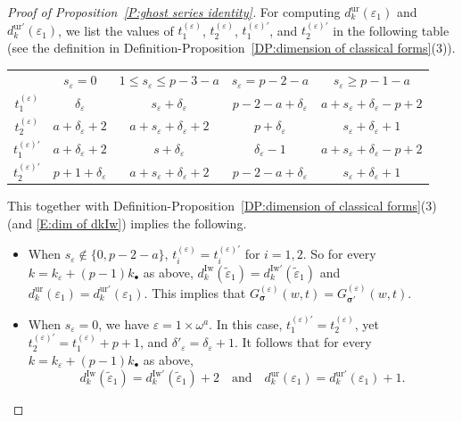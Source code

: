 \documentclass[12pt]{amsart}
\theoremstyle{definition}
\numberwithin{equation}{subsection}
\newcommand{\bbsigma}{\boldsymbol{\sigma}}
\newcommand{\Iw}{\mathrm{Iw}}
\newcommand{\ur}{\mathrm{ur}}
\begin{document}
\begin{proof}[Proof of Proposition~\ref{P:ghost series identity}]
For computing $d_k^\ur(\varepsilon_1)$ and $d_k^{\ur\prime}(\varepsilon_1)$, we list the values of $t_1^{(\varepsilon)}$, $t_2^{(\varepsilon)}$, $t_1^{(\varepsilon)\prime}$, and $t_2^{(\varepsilon)\prime}$ in the following table (see the definition in Definition-Proposition~\ref{DP:dimension of classical forms}(3)).
\begin{center}
\begin{tabular}{|c|c|c|c|c|}
\hline &$s_\varepsilon = 0$  & $1\leq s_\varepsilon \leq p-3-a$ & $s_\varepsilon = p-2-a$ & $s_\varepsilon \geq p-1-a$
\\
\hhline{|=|=|=|=|=|}
$t_1^{(\varepsilon)}$ & $\delta_\varepsilon$ & $s_\varepsilon+\delta_\varepsilon$ & $p-2-a+\delta_\varepsilon$ & $a+s_\varepsilon + \delta_\varepsilon-p+2$
\\
\hline
$t_2^{(\varepsilon)}$ & $a+\delta_\varepsilon + 2$ & $a+s_\varepsilon + \delta_\varepsilon+2$ & $p+\delta_\varepsilon$ & $s_\varepsilon + \delta_\varepsilon+1$
\\
\hline
$t_1^{(\varepsilon)'}$ & $a+\delta_\varepsilon + 2$ & $s+\delta_\varepsilon$ & $\delta_\varepsilon -1$ & $a+s_\varepsilon + \delta_\varepsilon-p+2$
\\
\hline
$t_2^{(\varepsilon)'}$ & $p+1+\delta_\varepsilon$ & $a+s_\varepsilon+\delta_\varepsilon + 2$ & $p-2-a+\delta_\varepsilon$ & $s_\varepsilon + \delta_\varepsilon+1$
\\
\hline
\end{tabular}
\end{center}
This together with Definition-Proposition~\ref{DP:dimension of classical forms}(3) (and \eqref{E:dim of dkIw}) implies the following.
\begin{itemize}
\item When $s_\varepsilon \not\in\{0, p-2-a\}$, $t_i^{(\varepsilon)} = t_i^{(\varepsilon)\prime}$ for $i=1,2$. So for every $k = k_\varepsilon+(p-1)k_\bullet$ as above, $d_k^\Iw(\tilde \varepsilon_1) = d_k^{\Iw\prime}(\tilde \varepsilon_1)$ and $d_k^\ur(\varepsilon_1) = d_k^{\ur\prime}(\varepsilon_1)$. This implies that $G_{\bbsigma}^{(\varepsilon)}(w,t) = G_{\bbsigma'}^{(\varepsilon)}(w,t)$.
\item When $s_\varepsilon =0$, we have $\varepsilon = 1 \times \omega^a$. In this case, $t_1^{(\varepsilon)\prime}= t_2^{(\varepsilon)}$, yet  $t_2^{(\varepsilon)\prime}= t_1^{(\varepsilon)}+p+1$, and $\delta'_\varepsilon = \delta_\varepsilon +1$.  It follows that for every $k = k_\varepsilon+(p-1)k_\bullet$ as above,
$$
d_k^\Iw(\tilde \varepsilon_1) = d_{k}^{\Iw\prime}(\tilde \varepsilon_1)+2 \quad \textrm{and}\quad d_k^\ur(\varepsilon_1) = d_{k}^{\ur\prime}(\varepsilon_1)+1.
$$
\end{itemize}
\end{proof}
\end{document}
